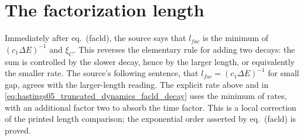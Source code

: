 \documentclass{article}
\begin{document}
\section{The factorization length}
Immediately after eq.~(facld), the source says that $l_{fac}$ is the
minimum of $(c_1\Delta E)^{-1}$ and $\xi_C$. This reverses the elementary
rule for adding two decays: the sum is controlled by the slower decay,
hence by the larger length, or equivalently the smaller rate. The source's
following sentence, that $l_{fac}=(c_1\Delta E)^{-1}$ for small gap, agrees
with the larger-length reading. The explicit rate above and in
\eqref{eq:hastings05_truncated_dynamics_facld_decay} uses the minimum of
rates, with an additional factor two to absorb the time factor. This is a
local correction of the printed length comparison; the exponential order
asserted by eq.~(facld) is proved.


\end{document}
